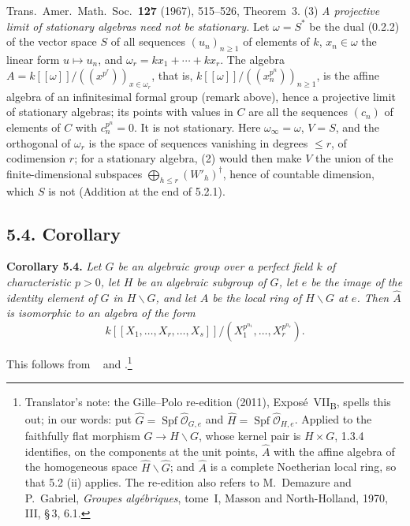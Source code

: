 Trans.\ Amer.\ Math.\ Soc.\ \textbf{127} (1967), 515--526, Theorem~3.
(3) \emph{A projective limit of stationary algebras need not be
stationary.} Let \(\omega=S^*\) be the dual \textup{(0.2.2)} of the vector
space \(S\) of all sequences \((u_n)_{n\geq1}\) of elements of \(k\),
\(x_n\in\omega\) the linear form \(u\mapsto u_n\), and
\(\omega_r=kx_1+\cdots+kx_r\). The algebra
\(A=k[[\omega]]/((x^{p^r}))_{x\in\omega_r}\), that is,
\(k[[\omega]]/((x_n^{p^n}))_{n\geq1}\), is the affine algebra of an
infinitesimal formal group (remark above), hence a projective limit of
stationary algebras; its points with values in \(C\) are all the
sequences \((c_n)\) of elements of \(C\) with \(c_n^{p^n}=0\). It is not
stationary. Here \(\omega_\infty=\omega\), \(V=S\), and the orthogonal of
\(\omega_r\) is the space of sequences vanishing in degrees \(\leq r\), of
codimension \(r\); for a stationary algebra, (2) would then make \(V\) the
union of the finite-dimensional subspaces
\(\bigoplus_{h\leq r}(W'_h)^\dagger\), hence of countable dimension, which
\(S\) is not (Addition at the end of 5.2.1).

\subsection*{5.4. Corollary}
\label{sga3:VIIB:5.4}

\noindent{}\textbf{Corollary 5.4.}
{\itshape Let \(G\) be an algebraic group over a perfect field
\(k\) of characteristic \(p>0\), let \(H\) be an algebraic
subgroup of \(G\), let \(e\) be the image of the identity element
of \(G\) in \(H\backslash G\), and let \(A\) be the local ring of \(H\backslash G\)
at \(e\). Then \(\widehat A\) is isomorphic to an algebra of the
form
\[
  k[[X_1,\ldots,X_r,\ldots,X_s]]
  \big/
  (X_1^{p^{n_1}},\ldots,X_r^{p^{n_r}}).
\]}

This follows from ~\textup{} and .\footnote{Translator's note: the Gille--Polo re-edition (2011),
Expos\'e~VII\textsubscript{B}, spells this out; in our words: put
\(\widehat G=\operatorname{Spf}\widehat{\mathcal O}_{G,e}\) and
\(\widehat H=\operatorname{Spf}\widehat{\mathcal O}_{H,e}\). Applied to the faithfully flat morphism
\(G\to H\backslash G\), whose kernel pair is \(H\times G\), 1.3.4 identifies, on the components at the unit
points, \(\widehat A\) with the affine algebra of the homogeneous space \(\widehat H\backslash\widehat G\); and
\(\widehat A\) is a complete Noetherian local ring, so that 5.2 (ii) applies. The re-edition also refers to
M.~Demazure and P.~Gabriel, \emph{Groupes alg\'ebriques}, tome~I, Masson and North-Holland, 1970, III,
\S\,3, 6.1.}
